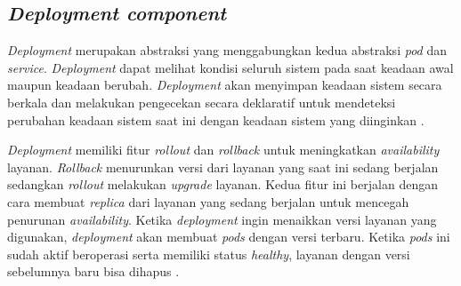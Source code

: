 \subsection{\textit{Deployment component}}

\textit{Deployment} merupakan abstraksi yang menggabungkan kedua abstraksi \textit{pod} dan \textit{service}. \textit{Deployment} dapat melihat kondisi seluruh sistem pada saat keadaan awal maupun keadaan berubah. \textit{Deployment} akan menyimpan keadaan sistem secara berkala dan melakukan pengecekan secara deklaratif untuk mendeteksi perubahan keadaan sistem saat ini dengan keadaan sistem yang diinginkan \parencite{deployment}.

\textit{Deployment} memiliki fitur \textit{rollout} dan \textit{rollback} untuk meningkatkan \textit{availability} layanan. \textit{Rollback} menurunkan versi dari layanan yang saat ini sedang berjalan sedangkan \textit{rollout} melakukan \textit{upgrade} layanan. Kedua fitur ini berjalan dengan cara membuat \textit{replica} dari layanan yang sedang berjalan untuk mencegah penurunan \textit{availability}. Ketika \textit{deployment} ingin menaikkan versi layanan yang digunakan, \textit{deployment} akan membuat \textit{pods} dengan versi terbaru. Ketika \textit{pods} ini sudah aktif beroperasi serta memiliki status \textit{healthy}, layanan dengan versi sebelumnya baru bisa dihapus \parencite{deployment}.